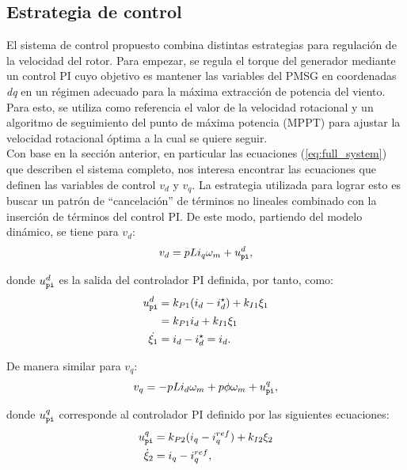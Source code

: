 {\subsection{Estrategia de control}

El sistema de control propuesto combina distintas estrategias para regulación de la velocidad del rotor.
Para empezar, se regula el torque del generador mediante un control PI cuyo objetivo es mantener las variables
del PMSG en coordenadas \emph{dq} en un régimen adecuado para la máxima extracción de potencia del viento. Para
esto, se utiliza como referencia el valor de la velocidad rotacional y un algoritmo de seguimiento del punto de
máxima potencia (MPPT) para ajustar la velocidad rotacional óptima a la cual se quiere seguir.
\\

Con base en la sección anterior, en particular las ecuaciones (\ref{eq:full_system}) que describen el 
sistema completo, nos interesa encontrar las ecuaciones que definen las variables de control $v_d$ y 
$v_q$. La estrategia utilizada para lograr esto es buscar un patrón de ``cancelación'' de términos 
no lineales combinado con la inserción de términos del control PI. De este modo, partiendo del modelo 
dinámico, se tiene para $v_d$:
\begin{align}
    v_d = pL i_q \omega_m + u_{\tt pi}^d \label{valUd},
\end{align}

donde $u^d_{\tt pi}$ es la salida del controlador PI definida, por tanto, como:
\begin{equation}
\begin{aligned}
    u_{\tt pi}^d &= k_{P1}(i_d-i_{d}^{\star}) + k_{I1}\xi_1\\
    &=k_{P1}i_d + k_{I1}\xi_1\\
    \dot{\xi_1} &= i_d-i_d^{\star}= i_d.
\end{aligned}
\label{eqUd}
\end{equation}

De manera similar para $v_q$:
\begin{align}
v_q = -pL i_d \omega_m + p\phi \omega_m + u_{\tt pi }^q,
\label{eqnVq}
\end{align}

donde $u_{\tt pi}^q$ corresponde al controlador PI definido por las siguientes ecuaciones:
\begin{equation}
\begin{aligned}
u^q_{\tt pi} &= k_{P2}(i_q - i_{q}^{ref}) + k_{I2}\xi_2 \\
\dot{\xi}_2 &= i_q - i_{q}^{ref},
\end{aligned}
\label{PI2}
\end{equation}

}
